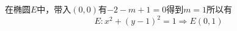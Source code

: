 在椭圆$E$中，带入$(0,0)$有$-2-m+1=0$得到$m=1$所以有
\begin{equation}
E:{x^2} + {\left( {y - 1} \right)^2} = 1 \Rightarrow E\left( {0,1} \right)
\end{equation}

